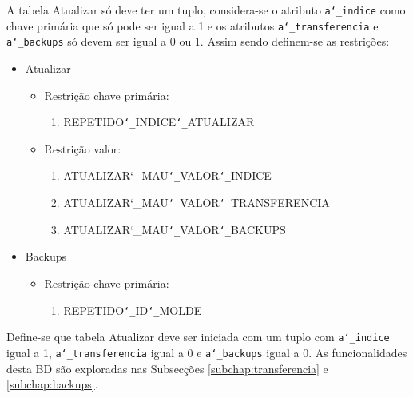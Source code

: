 \documentclass[11pt,twoside,a4paper]{report}
\begin{document}
\newpage
A tabela Atualizar só deve ter um tuplo, considera-se o atributo \texttt{a\char`_indice} como chave primária que só pode ser igual a 1 e os atributos \texttt{a\char`_transferencia} e \texttt{a\char`_backups} só devem ser igual a 0 ou 1. Assim sendo definem-se as restrições:
\begin{itemize}[noitemsep]
	\item Atualizar
	\begin{itemize}[noitemsep]
		\item Restrição chave primária:
		\begin{enumerate}
			\item REPETIDO\texttt{\char`_}INDICE\texttt{\char`_}ATUALIZAR
		\end{enumerate}
		\item Restrição valor:
		\begin{enumerate}
			\item ATUALIZAR{\char`_}MAU\texttt{\char`_}VALOR\texttt{\char`_}INDICE
			\item ATUALIZAR{\char`_}MAU\texttt{\char`_}VALOR\texttt{\char`_}TRANSFERENCIA
			\item ATUALIZAR{\char`_}MAU\texttt{\char`_}VALOR\texttt{\char`_}BACKUPS
		\end{enumerate}
	\end{itemize}
	\item Backups
	\begin{itemize}[noitemsep]
		\item Restrição chave primária:
		\begin{enumerate}
			\item REPETIDO\texttt{\char`_}ID\texttt{\char`_}MOLDE
		\end{enumerate}
	\end{itemize}
\end{itemize}
Define-se que tabela Atualizar deve ser iniciada com um tuplo com \texttt{a\char`_indice} igual a 1, \texttt{a\char`_transferencia} igual a 0 e \texttt{a\char`_backups} igual a 0. As funcionalidades desta BD são exploradas nas Subsecções \ref{subchap:transferencia} e \ref{subchap:backups}.
\end{document}
